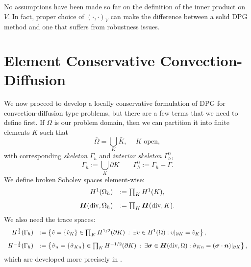 \documentclass[letterpaper]{article}
\newcommand{\LRp}[1]{\left( #1 \right)}
\newcommand{\ptl}{{\partial}}
\newcommand{\bfsig}{\mbox{\boldmath $\sigma$}}
\newcommand{\bfn}{\mbox{\boldmath $n$}}
\newcommand{\bfH}{\mbox{\boldmath $H$}}
\begin{document}
No assumptions have been made so far on the definition of the inner product on
$V$. In fact, proper choice of $\LRp{\cdot,\cdot}_V$ can make the difference
between a solid DPG method and one that suffers from robustness issues.

\section{Element Conservative Convection-Diffusion}
We now proceed to develop a locally conservative formulation of DPG for
convection-diffusion type problems, but there are a few terms that we need to
define first. If $\Omega$ is our problem domain, then we can partition it into
finite elements $K$ such that
\[
\overline{\Omega} = \bigcup_K  \bar{K},\: \quad K \text { open},
\]
with corresponding {\em skeleton} $\Gamma_h$ and {\em interior
  skeleton} $\Gamma_h^0$,
\[
\Gamma_h := \bigcup_K \partial K\qquad \Gamma_h^0 := \Gamma_h - \Gamma.
\]
We define broken Sobolev spaces element-wise:
\[
\begin{array}{rl}
H^1(\Omega_h) & := \prod_K H^1(K), \\[8pt]
\bfH(\text{div},\Omega_h) & := \prod_K \bfH(\text{div},K).
\end{array}
\]
We also need the trace spaces:
\[
\begin{array}{rl}
H^\frac{1}{2}(\Gamma_h) & := \left\{ \hat{v} = \{\hat{v}_K \} \in \prod_K H^{1/2}(\ptl K) \: :
\: \exists v \in H^1(\Omega) : v\vert_{\ptl K} = \hat{v}_K \right\}, \\[8pt]
H^{-\frac{1}{2}}(\Gamma_h) & := \left\{ {\hat{\sigma}}_n = \{ {\hat{\sigma}}_{Kn} \}\in \prod_K H^{-1/2}(\ptl K) \: : \: \exists \bfsig \in \bfH(\text{div},\Omega)
: {\hat{\sigma}}_{Kn} = (\bfsig \cdot \bfn)\vert_{\ptl K} \right\},
\end{array}
\]
which are developed more precisely in \cite{DPGStokes}.
\end{document}
